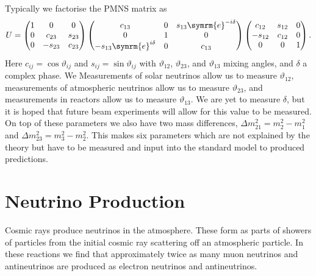 \documentclass[fleqn]{NotesClass}
\newcommand{\e}{\symrm{e}}
\begin{document}
    Typically we factorise the PMNS matrix as
    \begin{equation}
        U = 
        \begin{pmatrix}
            1 & 0 & 0\\
            0 & c_{23} & s_{23}\\
            0 & -s_{23} & c_{23}
        \end{pmatrix}
        \begin{pmatrix}
            c_{13} & 0 & s_{13}\e^{-i\delta}\\
            0 & 1 & 0\\
            -s_{13}\e^{i\delta} & 0 & c_{13}
        \end{pmatrix}
        \begin{pmatrix}
            c_{12} & s_{12} & 0\\
            -s_{12} & c_{12} & 0\\
            0 & 0 & 1
        \end{pmatrix}
        .
    \end{equation}
    Here \(c_{ij} = \cos \vartheta_{ij}\) and \(s_{ij} = \sin \vartheta_{ij}\) with \(\vartheta_{12}\), \(\vartheta_{23}\), and \(\vartheta_{13}\) mixing angles, and \(\delta\) a complex phase.
    We Measurements of solar neutrinos allow us to measure \(\vartheta_{12}\), measurements of atmospheric neutrinos allow us to measure \(\vartheta_{23}\), and measurements in reactors allow us to measure \(\vartheta_{13}\).
    We are yet to measure \(\delta\), but it is hoped that future beam experiments will allow for this value to be measured.
    On top of these parameters we also have two mass differences, \(\Delta m_{21}^2 = m_2^2 - m_1^2\) and \(\Delta m_{23}^2 = m_3^2 - m_2^2\).
    This makes six parameters which are not explained by the theory but have to be measured and input into the standard model to produced predictions.
    
    \section{Neutrino Production}
    Cosmic rays produce neutrinos in the atmosphere.
    These form as parts of showers of particles from the initial cosmic ray scattering off an atmospheric particle.
    In these reactions we find that approximately twice as many muon neutrinos and antineutrinos are produced as electron neutrinos and antineutrinos.
    
\end{document}
